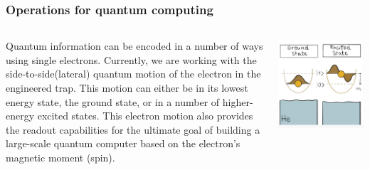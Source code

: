 \documentclass{beamer}
\begin{document}
\frame
    {
      \frametitle{Operations for quantum computing}
	
      \begin{footnotesize}
     \begin{columns}
       \column{5.0cm}
Quantum information can be encoded in a number of ways using single electrons. Currently, we are working with the side-to-side(lateral) quantum motion of the electron in the engineered trap. This motion can either be in its lowest energy state, the ground state, or in a number of higher-energy excited states. This electron motion also provides the readout capabilities for the ultimate goal of building a large-scale quantum computer based on the electron's magnetic moment (spin).       
\column{5cm}
      \begin{center}
	\includegraphics[width=1.2\textwidth]{qcfigures/nordicquantumfig4.png}
      \end{center}
\end{columns}
      \end{footnotesize}
    }
\end{document}
